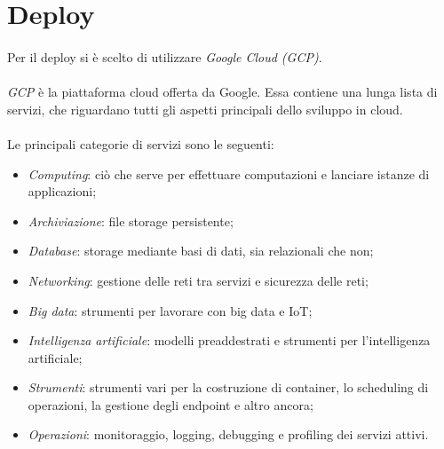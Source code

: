 \documentclass[11pt,a4paper,english]{article}
\begin{document}



\section{Deploy}

\paragraph{} Per il deploy si è scelto di utilizzare \emph{Google Cloud (GCP)}. 

\paragraph{} \emph{GCP} \cite{gcp} è la piattaforma cloud offerta da Google. Essa contiene una lunga lista di servizi, che riguardano tutti gli aspetti principali dello sviluppo in cloud.  

\paragraph{} Le principali categorie di servizi sono le seguenti:
\begin{itemize}
    \item \emph{Computing}: ciò che serve per effettuare computazioni e lanciare istanze di applicazioni;
    \item \emph{Archiviazione}: file storage persistente;
    \item \emph{Database}: storage mediante basi di dati, sia relazionali che non;
    \item \emph{Networking}: gestione delle reti tra servizi e sicurezza delle reti;
    \item \emph{Big data}: strumenti per lavorare con big data e IoT;
    \item \emph{Intelligenza artificiale}: modelli preaddestrati e strumenti per l'intelligenza artificiale;
    \item \emph{Strumenti}: strumenti vari per la costruzione di container, lo scheduling di operazioni, la gestione degli endpoint e altro ancora;
    \item \emph{Operazioni}: monitoraggio, logging, debugging e profiling dei servizi attivi.
\end{itemize}
\end{document}
